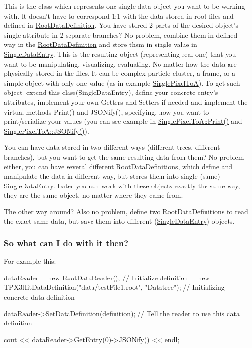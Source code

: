 \begin{DoxyItemize}
This is the class which represents one single data object you want to be working with. It doesn't have to correspond 1\+:1 with the data stored in root files and defined in \hyperlink{classRootDataDefinition}{Root\+Data\+Definition}. You have stored 2 parts of the desired object's single attribute in 2 separate branches? No problem, combine them in defined way in the \hyperlink{classRootDataDefinition}{Root\+Data\+Definition} and store them in single value in \hyperlink{classSingleDataEntry}{Single\+Data\+Entry}. This is the resulting object (representing real one) that you want to be manipulating, visualizing, evaluating. No matter how the data are physically stored in the files. It can be complex particle cluster, a frame, or a simple object with only one value (as in example \hyperlink{classSinglePixelToA}{Single\+Pixel\+To\+A}). To get such object, extend this class(\+Single\+Data\+Entry), define your concrete entry's attributes, implement your own Getters and Setters if needed and implement the virtual methods Print() and J\+S\+O\+Nify(), specifying, how you want to print/serialize your values (you can see example in \hyperlink{classSinglePixelToA_a8b9d4ef4082473c747157b9b2c1376b0}{Single\+Pixel\+To\+A\+::\+Print()} and \hyperlink{classSingleDataEntry_a9e48725016d6fbd6bd674d5b299dbb12}{Single\+Pixel\+To\+A\+::\+J\+S\+O\+Nify()}).

You can have data stored in two different ways (different trees, different branches), but you want to get the same resulting data from them? No problem either, you can have several different Root\+Data\+Definitions, which define and manipulate the data in different way, but stores them into single (same) \hyperlink{classSingleDataEntry}{Single\+Data\+Entry}. Later you can work with these objects exactly the same way, they are the same object, no matter where they came from.

The other way around? Also no problem, define two Root\+Data\+Definitions to read the exact same data, but save them into different (\hyperlink{classSingleDataEntry}{Single\+Data\+Entry}) objects.
\end{DoxyItemize}

\subsubsection*{So what can I do with it then?}

For example this\+:


\begin{DoxyCode}
dataReader = \textcolor{keyword}{new} \hyperlink{classRootDataReader}{RootDataReader}();      \textcolor{comment}{// Initialize}
definition = \textcolor{keyword}{new} TPX3HitDataDefinition(\textcolor{stringliteral}{"data/testFile1.root"}, \textcolor{stringliteral}{"Datatree"});  \textcolor{comment}{// Initializing concrete data
       definition}

dataReader->\hyperlink{classRootDataReader_ad670745df69f90ea6578d7c29cab716f}{SetDataDefinition}(definition);  \textcolor{comment}{// Tell the reader to use this data definition}

cout << dataReader->GetEntry(0)->JSONify() << endl;
\end{DoxyCode}


